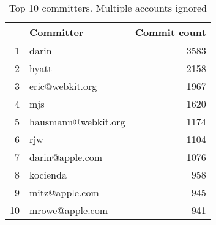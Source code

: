 \begin{table}[!htpb]
\begin{center}
\begin{tabular}{rlr}
  \hline
 & Committer & Commit count \\ 
  \hline
1 & darin & 3583 \\ 
  2 & hyatt & 2158 \\ 
  3 & eric@webkit.org & 1967 \\ 
  4 & mjs & 1620 \\ 
  5 & hausmann@webkit.org & 1174 \\ 
  6 & rjw & 1104 \\ 
  7 & darin@apple.com & 1076 \\ 
  8 & kocienda & 958 \\ 
  9 & mitz@apple.com & 945 \\ 
  10 & mrowe@apple.com & 941 \\ 
   \hline
\end{tabular}
\caption{Top 10 committers. Multiple accounts ignored}
\label{commits:top20}
\end{center}
\end{table}
